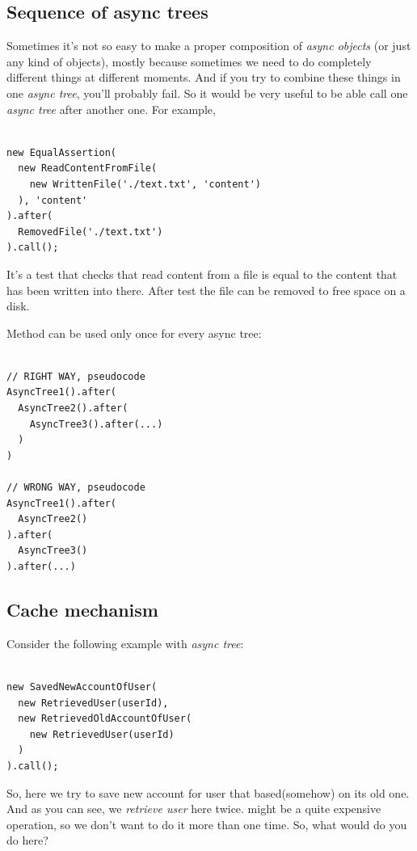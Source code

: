 \documentclass{article}
\newcommand{\cit}[1]{{\fontfamily{qcr}\selectfont{\textit{\textcolor{superdarkgray}{#1}}}}}
\begin{document}
\subsection{Sequence of async trees}

Sometimes it's not so easy to make a proper composition of \textit{async objects} (or just any kind of objects), mostly because sometimes we need to do completely different things at different moments. And if you try to combine these things in one \textit{async tree}, you'll probably fail. So it would be very useful to be able call one \textit{async tree} after another one. For example,

\begin{lstlisting}

new EqualAssertion(
  new ReadContentFromFile(
    new WrittenFile('./text.txt', 'content')
  ), 'content'
).after(
  RemovedFile('./text.txt')
).call();

\end{lstlisting}

It's a test that checks that read content from a file is equal to the content that has been written into there. After test the file can be removed to free space on a disk.

Method \cit{after} can be used only once for every async tree:

\begin{lstlisting}

// RIGHT WAY, pseudocode
AsyncTree1().after(
  AsyncTree2().after(
    AsyncTree3().after(...)
  )
)

// WRONG WAY, pseudocode
AsyncTree1().after(
  AsyncTree2()
).after(
  AsyncTree3()
).after(...)

\end{lstlisting}

\subsection{Cache mechanism}

Consider the following example with  \textit{async tree}:

\begin{lstlisting}

new SavedNewAccountOfUser(
  new RetrievedUser(userId),
  new RetrievedOldAccountOfUser(
    new RetrievedUser(userId)
  )
).call();

\end{lstlisting}

So, here we try to save new account for user that based(somehow) on its old one. And as you can see, we \textit{retrieve user} here twice. \cit{RetrievedUser} might be a quite expensive operation, so we don't want to do it more than one time. So, what would do you do here?
\end{document}
